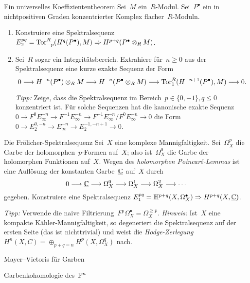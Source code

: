 \documentclass{uebblatt}
\begin{document}

\begin{aufgabe}{Ein universelles Koeffiziententheorem}
Sei~$M$ ein~$R$-Modul. Sei~$P^\bullet$ ein in nichtpositiven Graden
konzentrierter Komplex flacher~$R$-Moduln.
\begin{enumerate}
\item Konstruiere eine Spektralsequenz $E_2^{pq} =
\mathrm{Tor}_{-p}^R(H^q(P^\bullet),M) \Rightarrow H^{p+q}(P^\bullet \otimes_R M)$.
\item Sei~$R$ sogar ein Integritätsbereich. Extrahiere für~$n \geq 0$ aus der
Spektralsequenz eine kurze exakte Sequenz der Form
\[ 0 \longrightarrow H^{-n}(P^\bullet) \otimes_R M \longrightarrow H^{-n}(P^\bullet \otimes_R M)
  \longrightarrow \mathrm{Tor}_1^R(H^{-n+1}(P^\bullet), M) \longrightarrow 0. \]
{\tiny\emph{Tipp:} Zeige, dass die Spektralsequenz im Bereich~$p \in \{ 0,-1
\}, q \leq 0$ konzentriert ist. Für solche Sequenzen hat die
kanonische exakte Sequenz $0 \to F^0 E_\infty^{-n} \to F^{-1}
E_\infty^{-n} \to F^{-1} E_\infty^{-n} / F^0 E_\infty^{-n} \to 0$ die Form
$0 \to E_2^{0,-n} \to E_\infty^{-n} \to E_2^{-1,-n+1} \to 0$.\par}
\end{enumerate}
\end{aufgabe}

\begin{aufgabe}{Die Frölicher-Spektralsequenz}
Sei~$X$ eine komplexe Mannigfaltigkeit. Sei~$\Omega_X^p$ die Garbe der
holomorphen~$p$-Formen auf~$X$; also ist~$\Omega_X^0$ die Garbe der holomorphen
Funktionen auf~$X$. Wegen des \emph{holomorphen Poincaré-Lemmas} ist eine
Auflösung der konstanten Garbe~$\underline{\mathbb{C}}$ auf~$X$ durch
\[ 0 \longrightarrow \underline{\mathbb{C}} \longrightarrow \Omega_X^0 \longrightarrow \Omega_X^1 \longrightarrow \Omega_X^2 \longrightarrow \cdots \]
gegeben. Konstruiere eine Spektralsequenz $E_1^{pq} = \mathbb{H}^{p+q}(X,
\Omega_X^\bullet) \Rightarrow H^{p+q}(X,\underline{\mathbb{C}})$.

{\tiny\emph{Tipp:} Verwende die naive Filtrierung~$F^p \Omega_X^\bullet =
\Omega_X^{\geq p}$. \emph{Hinweis:} Ist~$X$ eine kompakte
Kähler-Mannigfaltigkeit, so degeneriert die Spektralsequenz auf der ersten
Seite (das ist nichttrivial) und weist die \emph{Hodge-Zerlegung} $H^n(X,C) = \oplus_{p+q=n}
H^p(X,\Omega_X^q)$ nach.\par}
\end{aufgabe}

Mayer--Vietoris für Garben

Garbenkohomologie des~$\mathbb{P}^n$
\end{document}
